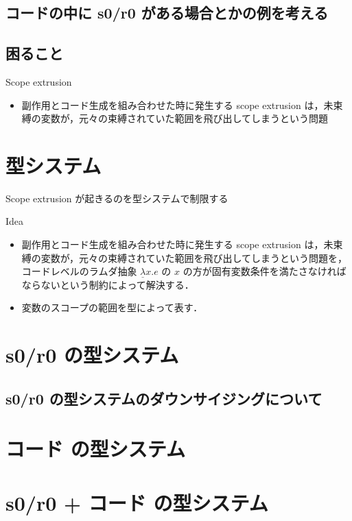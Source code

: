 \documentclass[10pt,a4paper,twocolumn]{jarticle}
\theoremstyle{definition}
\newcommand{\la}{\lambda}
\begin{document}
\subsection{コードの中に s0/r0 がある場合とかの例を考える}


\subsection{困ること}

Scope extrusion
\begin{itemize}
\item 副作用とコード生成を組み合わせた時に発生する scope extrusion は，未束縛の変数が，元々の束縛されていた範囲を飛び出してしまうという問題
\end{itemize}

\section{型システム}
Scope extrusion が起きるのを型システムで制限する

Idea
\begin{itemize}
\item 副作用とコード生成を組み合わせた時に発生する scope extrusion は，未束縛の変数が，元々の束縛されていた範囲を飛び出してしまうという問題を，コードレベルのラムダ抽象 $ \underline{\la} x.e $ の $x$ の方が固有変数条件を満たさなければならないという制約によって解決する．
\item 変数のスコープの範囲を型によって表す．
\end{itemize}

\section{s0/r0 の型システム}
\subsection{s0/r0 の型システムのダウンサイジングについて}

\section{コード の型システム}


\section{s0/r0 + コード の型システム}

\end{document}
